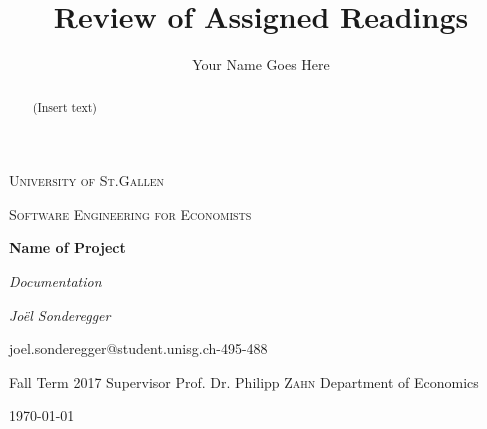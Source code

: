 \documentclass[a4paper,12pt]{article}
\title{Review of Assigned Readings}
\author{Your Name Goes Here}
\begin{document}
    \begin{titlepage}
        \centering
        {\scshape\LARGE University of St.Gallen \par}
        \vspace{1cm}
        {\scshape\Large Software Engineering for Economists \par}
        \vspace{1.3cm}
        {\huge\bfseries Name of Project  \par}
        {\Large\itshape Documentation\par}
        \vspace{3cm}
        {\Large\itshape Joël Sonderegger\par}
        \begin{spacing}{1.2}
        joel.sonderegger{@}student.unisg.ch-495-488\linebreak
        
        \vspace{1cm}
        Fall Term 2017
        \vfill
        Supervisor
        \linebreak
        Prof. Dr. Philipp \textsc{Zahn}
        \linebreak
        Department of Economics
        \end{spacing}
    
        \vfill
    
     {\large \today\par}
    
    \end{titlepage}
    \begin{abstract}
    \begin{spacing}{1.5}
    
  (Insert text)

    \end{spacing}
    
    \end{abstract}

    \clearpage
    \tableofcontents
    
    \clearpage
    
    \listoffigures
    
    \clearpage
\end{document}
